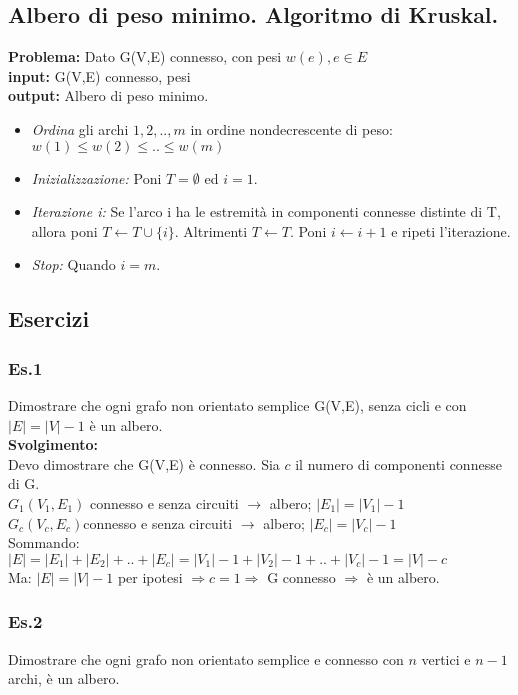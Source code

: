 \subsection{Albero di peso minimo. Algoritmo di Kruskal.}
\textbf{Problema:} Dato G(V,E) connesso, con pesi \( w(e), e \in E\) \\
\textbf{input:} G(V,E) connesso, pesi \\
\textbf{output:} Albero di peso minimo.\\
\begin{itemize}
\item \emph{Ordina} gli archi ${1, 2, .., m}$ in ordine nondecrescente di peso: \( w(1)\leq w(2)\leq .. \leq w(m)\)
\item \emph{Inizializzazione:} Poni $T=\emptyset$ ed $i=1$.
\item \emph{Iterazione i:} Se l'arco i ha le estremità in componenti connesse distinte di T, allora poni
\(T \leftarrow T \cup \{i\} \). Altrimenti \(T \leftarrow T\). Poni \(i \leftarrow i+1\) e ripeti l'iterazione.
\item \emph{Stop:} Quando $i=m$.
\end{itemize}

\subsection{Esercizi}
\subsubsection{Es.1}
Dimostrare che ogni grafo non orientato semplice G(V,E), senza cicli e con \(|E|=|V|-1\) è un albero. \\
\textbf{Svolgimento:} \\
Devo dimostrare che G(V,E) è connesso. Sia $c$ il numero di componenti connesse di G. \\
\(G_1(V_1,E_1)\) connesso e senza circuiti $\rightarrow$ albero; \( |E_1| = |V_1| -1 \) \\
\(G_c(V_c,E_c) \)connesso e senza circuiti $\rightarrow$ albero; \( |E_c| = |V_c| -1 \) \\
Sommando: \(|E|=|E_1|+ |E_2| + .. + |E_c| = |V_1|-1 + |V_2|-1 + .. + |V_c|-1 = |V| - c\) \\
Ma: \(|E| = |V| -1\) per ipotesi $\Rightarrow c=1 \Rightarrow$ G connesso $\Rightarrow$ è un albero.

\subsubsection{Es.2}
Dimostrare che ogni grafo non orientato semplice e connesso con $n$ vertici e $n-1$ archi,
è un albero.


